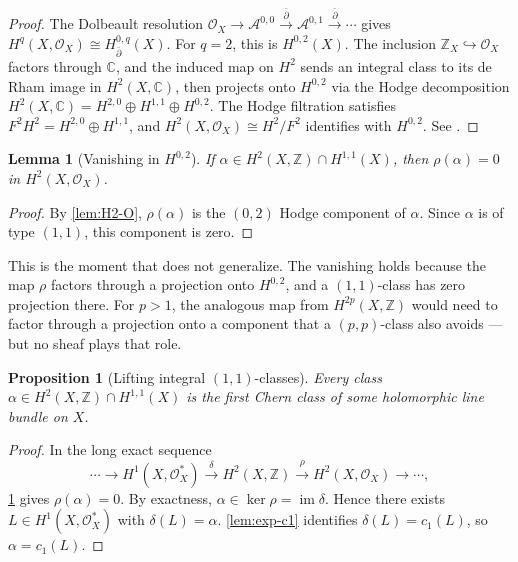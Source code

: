 \documentclass[12pt]{article}
\theoremstyle{plain}
\newtheorem{lemma}[theorem]{Lemma}
\newtheorem{proposition}[theorem]{Proposition}
\theoremstyle{definition}
\begin{document}
\begin{proof}
The Dolbeault resolution $\mathcal O_X \to \mathcal A^{0,0} \xrightarrow{\bar\partial} \mathcal A^{0,1} \xrightarrow{\bar\partial} \cdots$ gives $H^q(X,\mathcal O_X) \cong H_{\bar\partial}^{0,q}(X)$. 
For $q=2$, this is $H^{0,2}(X)$. 
The inclusion $\mathbb Z_X \hookrightarrow \mathcal O_X$ factors through $\mathbb C$, and the induced map on $H^2$ sends an integral class to its de Rham image in $H^2(X,\mathbb C)$, then projects onto $H^{0,2}$ via the Hodge decomposition $H^2(X,\mathbb C) = H^{2,0} \oplus H^{1,1} \oplus H^{0,2}$. 
The Hodge filtration satisfies $F^2 H^2 = H^{2,0} \oplus H^{1,1}$, and $H^2(X,\mathcal O_X) \cong H^2/F^2$ identifies with $H^{0,2}$. 
See \cite{voisin-hodge}.
\end{proof}

\begin{lemma}[Vanishing in $H^{0,2}$]\label{lem:vanishing}
If $\alpha \in H^2(X,\mathbb Z) \cap H^{1,1}(X)$, then $\rho(\alpha) = 0$ in $H^2(X,\mathcal O_X)$.
\end{lemma}

\begin{proof}
By \cref{lem:H2-O}, $\rho(\alpha)$ is the $(0,2)$ Hodge component of $\alpha$. 
Since $\alpha$ is of type $(1,1)$, this component is zero.
\end{proof}

This is the moment that does not generalize. 
The vanishing holds because the map $\rho$ factors through a projection onto $H^{0,2}$, and a $(1,1)$-class has zero projection there. 
For $p>1$, the analogous map from $H^{2p}(X,\mathbb Z)$ would need to factor through a projection onto a component that a $(p,p)$-class also avoids --- but no sheaf plays that role.

\begin{proposition}[Lifting integral $(1,1)$-classes]\label{prop:surjectivity}
Every class $\alpha \in H^2(X,\mathbb Z) \cap H^{1,1}(X)$ is the first Chern class of some holomorphic line bundle on $X$.
\end{proposition}

\begin{proof}
In the long exact sequence
\[
\cdots \to H^1(X,\mathcal O_X^*) \xrightarrow{\delta} H^2(X,\mathbb Z) \xrightarrow{\rho} H^2(X,\mathcal O_X) \to \cdots ,
\]
\cref{lem:vanishing} gives $\rho(\alpha)=0$. 
By exactness, $\alpha \in \ker\rho = \operatorname{im}\delta$. 
Hence there exists $L \in H^1(X,\mathcal O_X^*)$ with $\delta(L)=\alpha$. 
\cref{lem:exp-c1} identifies $\delta(L)=c_1(L)$, so $\alpha=c_1(L)$.
\end{proof}
\end{document}
